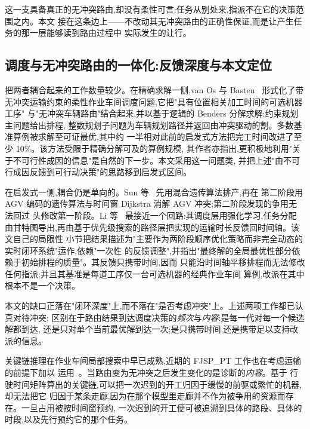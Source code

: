 \documentclass[manuscript,screen,review]{acmart}
\begin{document}
这一支具备真正的无冲突路由,却没有柔性可言:任务从别处来,指派不在它的决策范围之内。本文
接在这条边上——不改动其无冲突路由的正确性保证,而是让产生任务的那一层能够读到路由过程中
实际发生的让行。

\subsection{调度与无冲突路由的一体化:反馈深度与本文定位}

把两者耦合起来的工作数量较少。在精确求解一侧,van Os 与 Basten~\cite{vanos2026exact}
形式化了带无冲突运输约束的柔性作业车间调度问题,它把"具有位置相关加工时间的可选机器工序"
与"无冲突车辆路由"结合起来,并以基于逻辑的 Benders 分解求解:约束规划主问题给出排程,
整数规划子问题为车辆规划路径并返回由冲突驱动的割。多数基准算例被求解至可证最优,其中约
一半相对此前的启发式方法把完工时间改进了至少 10\%。该方法受限于精确分解可及的算例规模,
其作者亦指出,更积极地利用"关于不可行性成因的信息"是自然的下一步。本文采用这一问题类,
并把上述"由不可行成因反馈到可行动决策"的思路移到启发式区间。

在启发式一侧,耦合仍是单向的。Sun 等~\cite{sun2023integrated} 先用混合遗传算法排产,再在
第二阶段用 AGV 编码的遗传算法与时间窗 Dijkstra 消解 AGV 冲突;第二阶段发现的争用无法回过
头修改第一阶段。Li 等~\cite{li2026framework} 最接近一个回路:其调度层用强化学习,任务分配
由甘特图导出,再由基于优先级搜索的路径层把实现的运输时长反馈回时间轴。该文自己的局限性
小节把结果描述为"主要作为两阶段顺序优化策略而非完全动态的实时闭环系统"运作,依赖"一次性
的反馈调整",并指出"最终解的全局最优性部分依赖于初始排程的质量"。其反馈只携带时间,因而
只能沿时间轴平移排程而无法修改任何指派;并且其基准是每道工序仅一台可选机器的经典作业车间
算例,改派在其中根本不是一个决策。

本文的缺口正落在"闭环深度"上,而不落在"是否考虑冲突"上。上述两项工作都已认真对待冲突;
区别在于路由结果到达调度决策的\emph{频次}与\emph{内容}:是每一代对每一个候选解都到达,
还是只对单个当前最优解到达一次;是只携带时间,还是携带足以支持改派的信息。

关键链推理在作业车间局部搜索中早已成熟,近期的 FJSP\_PT 工作也在考虑运输的前提下加以
运用~\cite{qin2026knowledge}。当路由变为无冲突之后发生变化的是诊断的\emph{内容}。基于
行驶时间矩阵算出的关键链,可以把一次迟到的开工归因于缓慢的前驱或繁忙的机器,却无法把它
归因于某条走廊,因为在那个模型里走廊并不作为被争用的资源而存在。一旦占用被按时间窗预约,
一次迟到的开工便可被追溯到具体的路段、具体的时段,以及先行预约它的那个任务。
\end{document}
